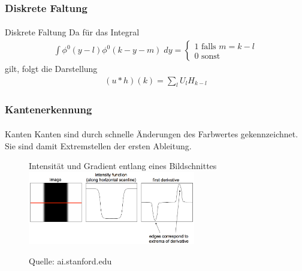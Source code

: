 \documentclass{beamer}
\begin{document}
\begin{frame}
    \frametitle{Diskrete Faltung}
\framesubtitle{}

    \begin{block}{Diskrete Faltung}
Da für das Integral 
\begin{align*}
  \int  \phi^0(y-l) \phi^0(k-y-m)  \; dy  = \begin{cases}
1 \text{ falls } m = k -l\\
0 \text{ sonst }
\end{cases}
\end{align*}
gilt, folgt die Darstellung
\begin{align*}
 (u  * h)(k) = \sum_l U_l H_{k-l}
\end{align*}

\end{block}

 \end{frame}


\begin{frame}
    \frametitle{Kantenerkennung}
\framesubtitle{}
\begin{block}{Kanten}
Kanten sind durch schnelle Änderungen des Farbwertes gekennzeichnet. Sie sind damit Extremstellen der ersten Ableitung.
\end{block}
\begin{figure}[htp]
      \centering
Intensität und Gradient entlang eines Bildschnittes \\
    \includegraphics[width=0.65\textwidth]{images/edgedetection} 
      \caption{Quelle: ai.stanford.edu}
\end{figure}

 \end{frame}
\end{document}
